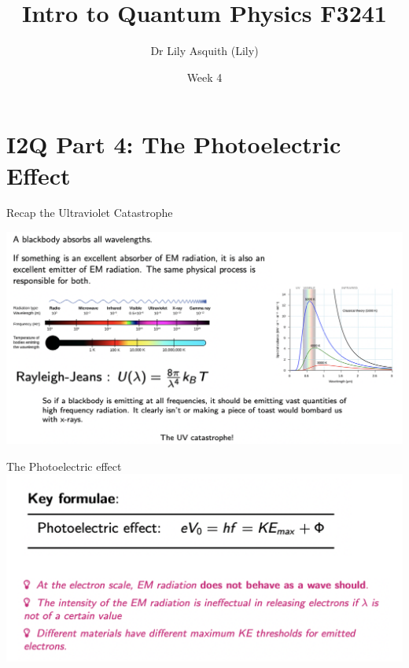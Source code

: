 


% 
\title[ Intro to Quantum Physics]{Intro to Quantum Physics F3241}
\author[Dr Lily Asquith (Lily)]{ Dr Lily Asquith (Lily)}
\date[Week 4]{ Week 4}





\begin{frame}
\titlepage
\end{frame} 


\section{I2Q Part 4: The Photoelectric Effect}

 




\begin{frame}{Recap the Ultraviolet Catastrophe}
\small

\includegraphics[scale=0.45]{uvcatas-recap}
\end{frame}




\begin{frame}{The Photoelectric effect}
\small
\includegraphics[scale=0.45]{peform}
\end{frame}

